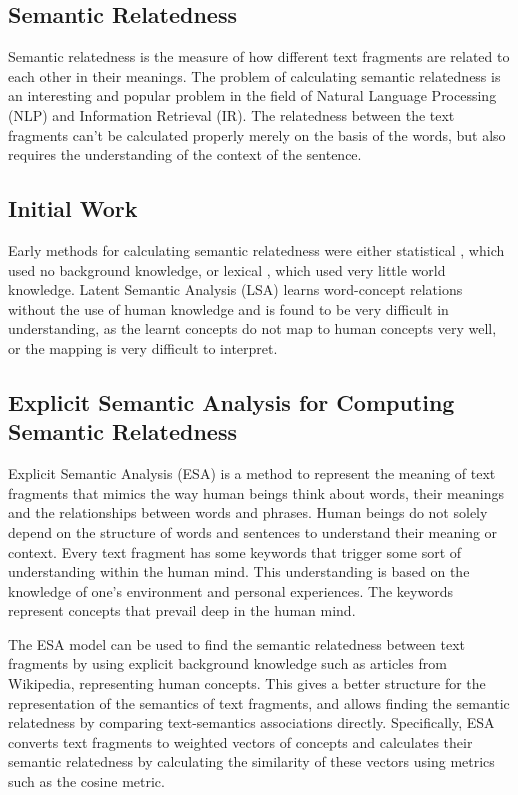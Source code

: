 \documentclass[conference]{IEEEtran}
\begin{document}
\subsection {Semantic Relatedness}

Semantic relatedness is the measure of how different text fragments are related to each other in their meanings. The problem of calculating semantic relatedness is an interesting and popular problem in the field of Natural Language Processing (NLP) and Information Retrieval (IR). The relatedness between the text fragments can't be calculated properly merely on the basis of the words, but also requires the understanding of the context of the sentence.

\subsection {Initial Work}

Early methods for calculating semantic relatedness were either statistical \cite{statistical, LSA}, which used no background knowledge, or lexical \cite{lexical}, which used very little world knowledge. Latent Semantic Analysis (LSA) \cite{LSA} learns word-concept relations without the use of human knowledge and is found to be very difficult in understanding, as the learnt concepts do not map to human concepts very well, or the mapping is very difficult to interpret.

\subsection {Explicit Semantic Analysis for Computing Semantic Relatedness}

Explicit Semantic Analysis (ESA) \cite{ESA} is a method to represent the meaning of text fragments that mimics the way human beings think about words, their meanings and the relationships between words and phrases. Human beings do not solely depend on the structure of words and sentences to understand their meaning or context. Every text fragment has some keywords that trigger some sort of understanding within the human mind. This understanding is based on the knowledge of one's environment and personal experiences. The keywords represent concepts that prevail deep in the human mind.

The ESA model can be used to find the semantic relatedness between text fragments by using explicit background knowledge such as articles from Wikipedia, representing human concepts. This gives a better structure for the representation of the semantics of text fragments, and allows finding the semantic relatedness by comparing text-semantics associations directly. Specifically, ESA converts text fragments to weighted vectors of concepts and calculates their semantic relatedness by calculating the similarity of these vectors using metrics such as the cosine metric.
\end{document}
